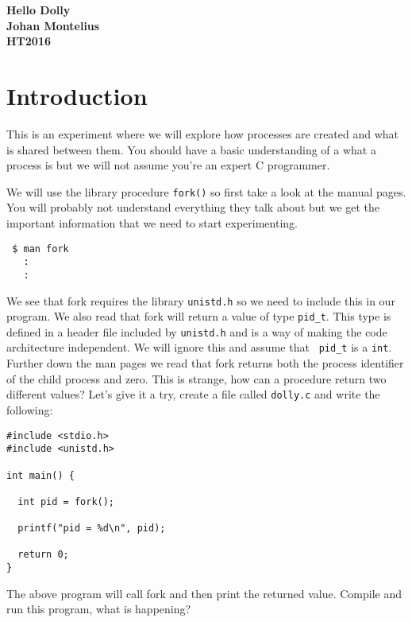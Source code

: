 \documentclass[a4paper,11pt]{article}
\begin{document}
\begin{center} \vspace{20pt} \textbf{\large Hello Dolly}\\
\vspace{10pt} \textbf{Johan Montelius}\\ \vspace{10pt} \textbf{HT2016}
\end{center}


\section{Introduction}

This is an experiment where we will explore how processes are created
and what is shared between them. You should have a basic understanding
of a what a process is but we will not assume you're an expert C programmer. 

We will use the library procedure {\tt fork()} so first take a look at
the manual pages. You will probably not understand everything they
talk about but we get the important information that we need to start
experimenting. 

\begin{verbatim}
 $ man fork
   :
   :
\end{verbatim}

We see that fork requires the library {\tt unistd.h} so we need to
include this in our program. We also read that fork will return a
value of type {\tt pid\_t}. This type is defined in a header file
included by {\tt unistd.h} and is a way of making the code
architecture independent. We will ignore this and assume that {\tt
  pid\_t} is a {\tt int}. Further down the man pages we read that fork
returns both the process identifier of the child process and
zero. This is strange, how can a procedure return two different
values? Let's give it a try, create a file called {\tt dolly.c} and
write the following:

\begin{lstlisting}
#include <stdio.h>
#include <unistd.h>

int main() {

  int pid = fork();

  printf("pid = %d\n", pid);

  return 0;
}
\end{lstlisting}

The above program will call fork and then print the returned
value. Compile and run this program, what is happening?
\end{document}
